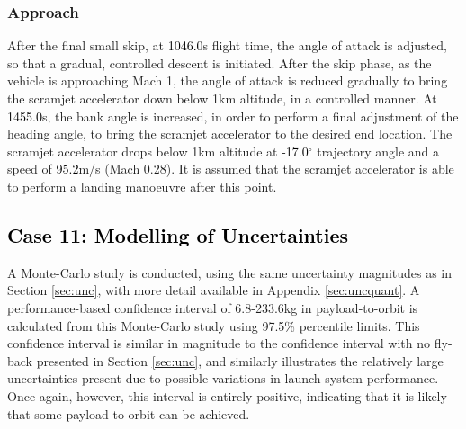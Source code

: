 \subsubsection{Approach}

After the final small skip, at \textcolor{black}{1046.0}s flight time, the angle of attack is adjusted, so that a gradual, controlled descent is initiated. 
After the skip phase, as the vehicle is approaching Mach 1, the angle of attack is reduced gradually to bring the scramjet accelerator down below 1km altitude, in a controlled manner. At \textcolor{black}{1455.0}s, the bank angle is increased, in order to perform a final adjustment of the heading angle, to bring the scramjet accelerator to the desired end location. 
The scramjet accelerator drops below 1km altitude at \textcolor{black}{-17.0}$^\circ$ trajectory angle and a speed of \textcolor{black}{95.2}m/s (Mach 0.28). It is assumed that the scramjet accelerator is able to perform a landing manoeuvre after this point. 


\textcolor{black}{
	\section{Case 11: Modelling of Uncertainties}}
\noindent
A Monte-Carlo study is conducted, using the same uncertainty magnitudes as in Section \ref{sec:unc}, with more detail available in Appendix \ref{sec:uncquant}. A performance-based confidence interval of 6.8-233.6kg in payload-to-orbit is calculated from this Monte-Carlo study using 97.5\% percentile limits. This confidence interval is similar in magnitude to the confidence interval with no fly-back presented in Section \ref{sec:unc}, and similarly illustrates the relatively large uncertainties present due to possible variations in launch system performance. Once again, however, this interval is entirely positive, indicating that it is likely that some payload-to-orbit can be achieved. 

